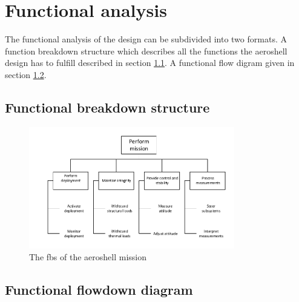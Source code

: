 \section{Functional analysis}\label{ch:func}

The functional analysis of the design can be subdivided into two formats. A function breakdown structure which describes all the functions the aeroshell design has to fulfill described in section \ref{sec:fbs}. A functional flow digram given in section \ref{sec:ffd}.

\subsection{Functional breakdown structure} \label{sec:fbs}



\begin{figure}[H]
\centering
\includegraphics[width = 0.8\textwidth]{Figure/FBS.pdf}
\caption{The \gls{fbs} of the aeroshell mission}
\label{fig:fbd}
\end{figure}

\subsection{Functional flowdown diagram} \label{sec:ffd}

